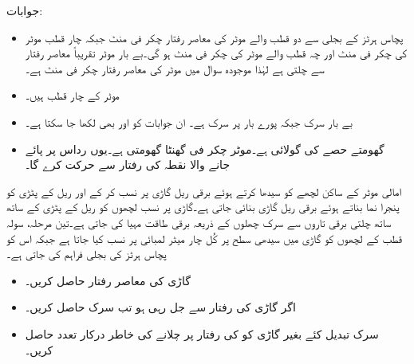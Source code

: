 جوابات:
\begin{itemize}
\item
پچاس ہرٹز کے بجلی سے دو قطب والے موٹر کی معاصر رفتار  چکر فی منٹ جبکہ چار قطب موٹر کی  چکر فی منٹ اور چہ قطب والے موٹر کی  چکر فی منٹ ہو گی۔بے بار موٹر تقریباً معاصر رفتار سے چلتی ہے لہٰذا موجودہ سوال میں موٹر کی معاصر رفتار  چکر فی منٹ ہے۔
\item
موٹر کے چار قطب ہیں۔
\item
بے بار سرک  جبکہ پورے بار پر سرک  ہے۔ ان جوابات کو  اور  بھی لکھا جا سکتا ہے۔
\item
گھومتے حصے کی گولائی  ہے۔موٹر   چکر فی گھنٹا گھومتی ہے۔یوں رداس پر پائے جانے والا نقطہ  کی رفتار سے حرکت کرے گا۔
\end{itemize}
امالی موٹر کے  ساکن لچھے کو سیدھا کرتے ہوئے  برقی ریل گاڑی پر نسب کر کے اور ریل کے پٹڑی کو پنجرا نما بناتے ہوئے برقی ریل گاڑی بنائی جاتی ہے۔گاڑی پر نسب لچھوں کو ریل کے پٹڑی کے ساتھ ساتھ چلتی برقی تاروں سے سرک چھلوں کے ذریعہ برقی طاقت مہیا کی جاتی ہے۔تین مرحلہ، سولہ قطب کے لچھوں کو گاڑی میں سیدھی سطح پر کُل چار میٹر لمبائی پر نسب کیا جاتا ہے جبکہ اس کو پچاس ہرٹز کی بجلی فراہم کی جاتی ہے۔
\begin{itemize}
\item
گاڑی کی معاصر رفتار حاصل کریں۔
\item
اگر گاڑی  کی رفتار سے جل رہی ہو تب سرک حاصل کریں۔
\item
سرک تبدیل کئے بغیر گاڑی کو  کی رفتار پر چلانے کی خاطر درکار تعدد حاصل کریں۔ 
\end{itemize}   

